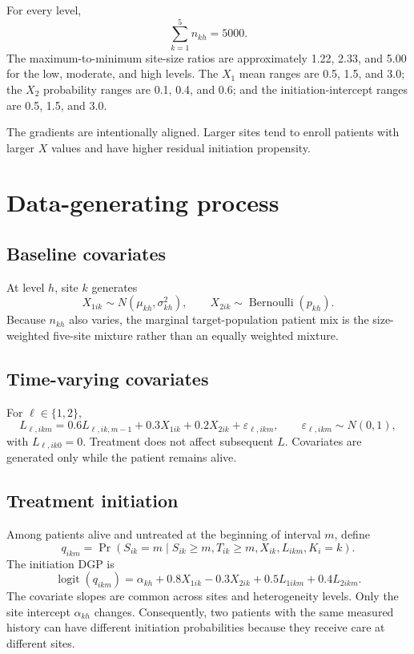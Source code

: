 \documentclass[11pt]{article}
\newcommand{\Prb}{\operatorname{Pr}}
\begin{document}
For every level,
\[
  \sum_{k=1}^5 n_{kh}=5000.
\]
The maximum-to-minimum site-size ratios are approximately 1.22, 2.33, and
5.00 for the low, moderate, and high levels. The $X_1$ mean ranges are 0.5,
1.5, and 3.0; the $X_2$ probability ranges are 0.1, 0.4, and 0.6; and the
initiation-intercept ranges are 0.5, 1.5, and 3.0.

The gradients are intentionally aligned. Larger sites tend to enroll patients
with larger $X$ values and have higher residual initiation propensity. 

\section{Data-generating process}

\subsection{Baseline covariates}

At level $h$, site $k$ generates
\[
  X_{1ik}\sim N(\mu_{kh},\sigma_{kh}^2),
  \qquad
  X_{2ik}\sim\operatorname{Bernoulli}(p_{kh}).
\]
Because $n_{kh}$ also varies, the marginal target-population patient mix is
the size-weighted five-site mixture rather than an equally weighted mixture.

\subsection{Time-varying covariates}

For $\ell\in\{1,2\}$,
\begin{equation}
\label{eq:L-dgp}
  L_{\ell,ikm}
  =0.6L_{\ell,ik,m-1}
   +0.3X_{1ik}
   +0.2X_{2ik}
   +\varepsilon_{\ell,ikm},
  \qquad
  \varepsilon_{\ell,ikm}\sim N(0,1),
\end{equation}
with $L_{\ell,ik0}=0$. Treatment does not affect subsequent $L$. Covariates
are generated only while the patient remains alive.

\subsection{Treatment initiation}

Among patients alive and untreated at the beginning of interval $m$, define
\[
  q_{ikm}
  =\Prb(S_{ik}=m\mid S_{ik}\geq m,T_{ik}\geq m,
                         X_{ik},L_{ikm},K_i=k).
\]
The initiation DGP is
\begin{equation}
\label{eq:init-dgp}
  \operatorname{logit}(q_{ikm})
  =\alpha_{kh}
   +0.8X_{1ik}
   -0.3X_{2ik}
   +0.5L_{1ikm}
   +0.4L_{2ikm}.
\end{equation}
The covariate slopes are common across sites and heterogeneity levels. Only
the site intercept $\alpha_{kh}$ changes. Consequently, two patients with the
same measured history can have different initiation probabilities because
they receive care at different sites.
\end{document}
